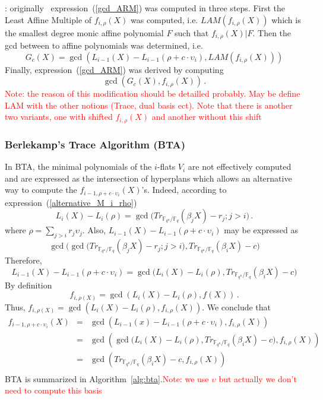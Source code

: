\documentclass{article}
\newcommand{\ff}[1]{\mathbb{F}_{#1}}
\newcommand{\qq}{q}
\newcommand{\nn}{n}
\newcommand{\qn}{{\qq^\nn}}
\newcommand{\basef}{\ff{\qq}}
\newcommand{\extf}{\ff{\qn}}
\newcommand{\Notes}[1]{\textcolor{red}{Note: #1}}
\begin{document}
: originally~\cite{van1989geometric} expression~(\ref{gcd_ARM}) was computed in three steps. First the Least Affine Multiple of 
$f_{i,\rho}(X)$ was computed, i.e. $LAM(f_{i,\rho}(X))$ which is  the smallest degree monic affine polynomial $F$ such that $f_{i,\rho}(X)|F$. Then the gcd between to affine polynomials was determined, i.e. 
$$G_c(X)=\gcd(L_{i-1}(X)-L_{i-1}(\rho+c \cdot \upsilon_i),LAM(f_{i,\rho}(X)) ) $$
Finally, expression~(\ref{gcd_ARM}) was derived by computing
$$\gcd(G_c(X), f_{i,\rho}(X))\,.$$
\Notes{the reason of this modification should be detailled probably. May be define LAM with the other notions (Trace, dual basis ect). Note that there is 
another two variants, one with shifted $f_{i,\rho}(X)$ and another without this shift}




\subsubsection{Berlekamp's Trace Algorithm (BTA)}
\label{sec:BTA}
In BTA, the minimal polynomials of the $i$-flats $V_{i}$ are not effectively computed and are expressed as the intersection of hyperplans which allows an alternative way to compute the $f_{i-1,\rho+c \cdot \upsilon_i}(X)$'s. Indeed, according to expression~(\ref{alternative_M_i_rho})
$$L_i(X)-L_i(\rho)=\gcd\bigl(Tr_{\extf/\basef}(\beta_j X) -r_j ;j>i\bigr)\,.$$
where $\rho=\sum_{j>i}r_j\upsilon_j$. Also, $L_{i-1}(X)-L_{i-1}(\rho +c \cdot \upsilon_i)$ may be expressed as
$$
\gcd\bigl(\gcd\bigl(Tr_{\extf/\basef}(\beta_j X) -r_j ;j>i\bigr), Tr_{\extf/\basef}(\beta_i X) -c  \bigr)
$$
Therefore, 
\begin{equation}
\label{alt_formula}
L_{i-1}(X)-L_{i-1}(\rho +c \cdot \upsilon_i)=
\gcd\bigl(L_i(X)-L_i(\rho), Tr_{\extf/\basef}(\beta_i X) -c  \bigr)
\end{equation}
By definition 
$$f_{i,\rho(X)}=\gcd(L_i(X)-L_i(\rho),f(X))\,.$$ 
Thus, $f_{i,\rho(X)}=\gcd(L_i(X)-L_i(\rho),f_{i,\rho}(X))$.
We conclude that 
$$
\begin{array}{lll}
f_{i-1,\rho+c \cdot \upsilon_i}(X)&=&\gcd(L_{i-1}(x)-L_{i-1}(\rho +c \cdot \upsilon_i) ,f_{i,\rho}(X)  ) \\
&=&  \gcd(  \gcd\bigl(L_i(X)-L_i(\rho), Tr_{\extf/\basef}(\beta_i X) -c  \bigr)     ,  f_{i,\rho}(X) )    \\
&=&  \gcd( Tr_{\extf/\basef}(\beta_i X) -c ,  f_{i,\rho}(X) )    \\
\end{array}
$$
BTA is summarized in Algorithm~\ref{alg:bta}.\Notes{we use $\upsilon$ but actually we don't need to compute this basis}
\end{document}
